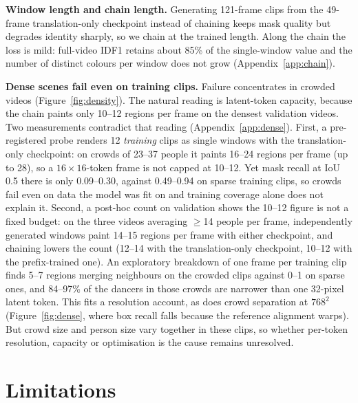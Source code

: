 \documentclass{article} %
\newcommand{\rev}[1]{#1}
\begin{document}
\textbf{Window length and chain length.} Generating 121-frame clips from the 49-frame
translation-only checkpoint instead of chaining keeps mask quality but degrades identity
sharply, so we chain at the trained length. Along the chain the loss is mild: full-video
IDF1 retains \rev{about} 85\% of the single-window value and the number of
distinct colours per window does not grow (Appendix~\ref{app:chain}).

\textbf{\rev{Dense scenes fail even on training clips.}} \rev{Failure concentrates in
crowded videos (Figure~\ref{fig:density}). The natural reading is latent-token
capacity, because the chain paints only 10--12 regions per frame on the densest validation
videos. Two measurements contradict that reading (Appendix~\ref{app:dense}). First, a
pre-registered probe renders 12 \emph{training} clips as single windows
with the translation-only checkpoint: on crowds of 23--37 people it paints 16--24 regions per
frame (up to 28), so a $16\times16$-token frame is not capped at 10--12. Yet mask recall at
IoU 0.5 there is only 0.09--0.30, against 0.49--0.94 on sparse training clips, so crowds fail
even on data the model was fit on and training coverage alone does not explain it. Second, a
post-hoc count on validation shows the 10--12 figure is not a fixed budget: on the three
videos averaging $\geq$14 people per frame, independently generated windows paint 14--15
regions per frame with either checkpoint, and chaining lowers the count (12--14 with the
translation-only checkpoint, 10--12 with the prefix-trained one). An exploratory breakdown
of one frame per training clip finds 5--7 regions merging neighbours on the crowded clips
against 0--1 on sparse ones, and 84--97\% of the dancers in those crowds are narrower than one 32-pixel latent token. This
fits a resolution account, as does crowd separation at $768^2$ (Figure~\ref{fig:dense},
where box recall falls because the reference alignment warps). But crowd size and person size vary together in these clips, so
whether per-token resolution, capacity or optimisation is the cause remains unresolved.}

\section{Limitations}
\label{sec:limitations}
\end{document}
